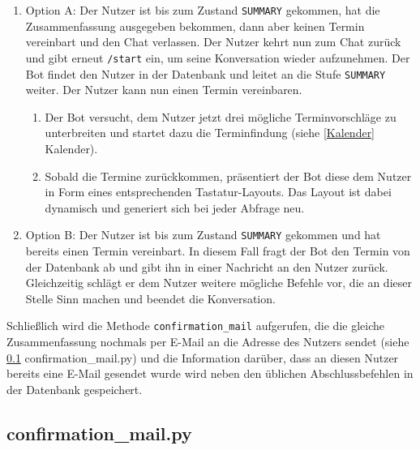                 \begin{enumerate}
                
                    \item Option A:  Der Nutzer ist bis zum Zustand \verb|SUMMARY| gekommen, hat die Zusammenfassung ausgegeben bekommen, dann aber keinen Termin vereinbart und den Chat verlassen. Der Nutzer kehrt nun zum Chat zurück und gibt erneut \verb|/start| ein, um seine Konversation wieder aufzunehmen. Der Bot findet den Nutzer in der Datenbank und leitet an die Stufe \verb|SUMMARY| weiter. Der Nutzer kann nun einen Termin vereinbaren. \\
                    
                    \begin{enumerate}
                        \item Der Bot versucht, dem Nutzer jetzt drei mögliche Terminvorschläge zu unterbreiten und startet dazu die Terminfindung (siehe \ref{Kalender} Kalender).
                        \item Sobald die Termine zurückkommen, präsentiert der Bot diese dem Nutzer in Form eines entsprechenden Tastatur-Layouts. Das Layout ist dabei dynamisch und generiert sich bei jeder Abfrage neu.
                    \end{enumerate}
                
                    \item Option B: Der Nutzer ist bis zum Zustand \verb|SUMMARY| gekommen und hat bereits einen Termin vereinbart. In diesem Fall fragt der Bot den Termin von der Datenbank ab und gibt ihn in einer Nachricht an den Nutzer zurück. Gleichzeitig schlägt er dem Nutzer weitere mögliche Befehle vor, die an dieser Stelle Sinn machen und beendet die Konversation.
                
                \end{enumerate}

            Schließlich wird die Methode \verb|confirmation_mail| aufgerufen, die die gleiche Zusammenfassung nochmals per E-Mail an die Adresse des Nutzers sendet (siehe \ref{confirmation_mail.py} confirmation\_mail.py) und die Information darüber, dass an diesen Nutzer bereits eine E-Mail gesendet wurde wird neben den üblichen Abschlussbefehlen in der Datenbank gespeichert.

                    
        \subsection{confirmation\_mail.py} \label{confirmation_mail.py}

